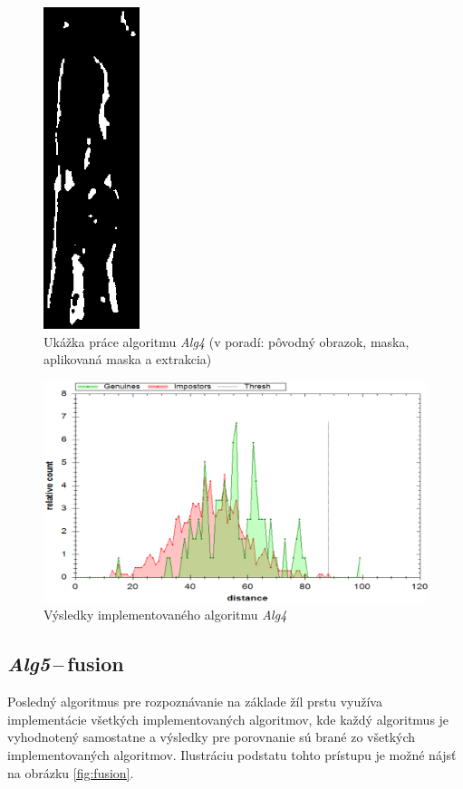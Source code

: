 \documentclass[11pt,a4paper]{article}
\begin{document}
\begin{figure}[ht!]
	\includegraphics[width=2.8cm]{fig/F_08_extrakce.eps}
	\caption{\label{fig:alg4} Ukážka práce algoritmu \emph{Alg4} (v poradí:
	pôvodný obrazok, maska, aplikovaná maska a extrakcia)}
\end{figure}
\vfill
\vfill

\begin{figure}[ht!]
	\centering
	\includegraphics[width=17cm]{fig/alg4.eps}
	\caption{\label{fig:alg4} Výsledky implementovaného algoritmu \emph{Alg4}}
\end{figure}

\clearpage
\subsection{\emph{Alg5}\,--\,fusion} \label{Alg5}

Posledný algoritmus pre rozpoznávanie na základe žíl prstu využíva implementácie
všetkých implementovaných algoritmov, kde každý algoritmus je vyhodnotený
samostatne a výsledky pre porovnanie sú brané zo všetkých implementovaných
algoritmov. Ilustráciu podstatu tohto prístupu je možné nájsť na obrázku
\ref{fig:fusion}.
\end{document}
